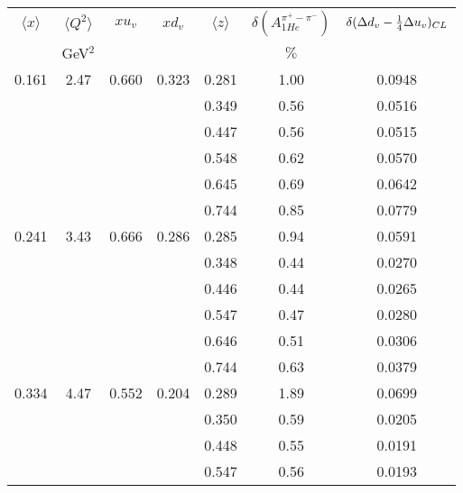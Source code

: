 \begin{table}[htbp]
\begin{center}
\begin{tabular}{|ccccc||c|c|}
\hline
$\langle x \rangle $   & $ \langle Q^2 \rangle $   & $x  u_v$ & $x d_v$ & $\langle z \rangle$ & $\delta \left(A_{1He}^{\pi^+ - \pi^-} \right)$  &
$\delta ( \Delta d_v -{1 \over 4} \Delta u_v )_{CL}$  \\
                       & GeV$^2$              &          &    &       &  $\%$    &                                                              \\ \hline \hline
  0.161 &    2.47 &   0.660 &    0.323 &    0.281 &      1.00 &    0.0948 \\
         &          &          &          &    0.349 &      0.56 &    0.0516 \\
         &          &          &          &    0.447 &      0.56 &    0.0515 \\
         &          &          &          &    0.548 &      0.62 &    0.0570 \\
         &          &          &          &    0.645 &      0.69 &    0.0642 \\
         &          &          &          &    0.744 &      0.85 &    0.0779 \\
   0.241 &    3.43 &   0.666 &    0.286 &    0.285 &      0.94 &    0.0591 \\
         &          &          &          &    0.348 &      0.44 &    0.0270 \\
         &          &          &          &    0.446 &      0.44 &    0.0265 \\
         &          &          &          &    0.547 &      0.47 &    0.0280 \\
         &          &          &          &    0.646 &      0.51 &    0.0306 \\
         &          &          &          &    0.744 &      0.63 &    0.0379 \\
   0.334 &    4.47 &   0.552 &    0.204 &    0.289 &      1.89 &    0.0699 \\
         &          &          &          &    0.350 &      0.59 &    0.0205 \\
         &          &          &          &    0.448 &      0.55 &    0.0191 \\
         &          &          &          &    0.547 &      0.56 &    0.0193 \\

\end{tabular}
\end{center}
\end{table}
